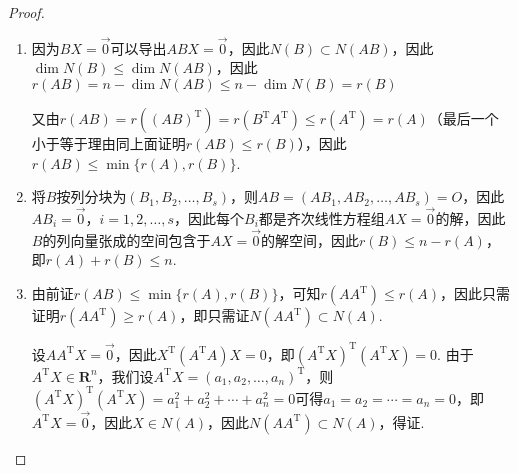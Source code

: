\begin{proof}
    \begin{enumerate}
        \item 因为$BX=\vec{0}$可以导出$ABX=\vec{0}$，因此$N(B)\subset N(AB)$，因此$\dim N(B)\leqslant\dim N(AB)$，因此$r(AB)=n-\dim N(AB)\leqslant n-\dim N(B)=r(B)$

              又由$r(AB)=r((AB)^{\mathrm{T}})=r(B^{\mathrm{T}}A^{\mathrm{T}})\leqslant r(A^{\mathrm{T}})=r(A)$（最后一个小于等于理由同上面证明$r(AB)\leqslant r(B)$），因此$r(AB)\leqslant\min\{r(A),r(B)\}$.

        \item 将$B$按列分块为$(B_1,B_2,\ldots,B_s)$，则$AB=(AB_1,AB_2,\ldots,AB_s)=O$，因此$AB_i=\vec{0}$，$i=1,2,\ldots,s$，因此每个$B_i$都是齐次线性方程组$AX=\vec{0}$的解，因此$B$的列向量张成的空间包含于$AX=\vec{0}$的解空间，因此$r(B)\leqslant n-r(A)$，即$r(A)+r(B)\leqslant n$.

        \item 由前证$r(AB)\leqslant\min\{r(A),r(B)\}$，可知$r(AA^\mathrm{T})\leqslant r(A)$，因此只需证明$r(AA^\mathrm{T})\geqslant r(A)$，即只需证$N(AA^\mathrm{T})\subset N(A)$.

              设$AA^\mathrm{T}X=\vec{0}$，因此$X^\mathrm{T}(A^\mathrm{T}A)X=0$，即$(A^\mathrm{T}X)^\mathrm{T}(A^\mathrm{T}X)=0$. 由于$A^\mathrm{T}X\in\mathbf{R}^n$，我们设$A^\mathrm{T}X=(a_1,a_2,\ldots,a_n)^\mathrm{T}$，则$(A^\mathrm{T}X)^\mathrm{T}(A^\mathrm{T}X)=a_1^2+a_2^2+\cdots+a_n^2=0$可得$a_1=a_2=\cdots=a_n=0$，即$A^\mathrm{T}X=\vec{0}$，因此$X \in N(A)$，因此$N(AA^\mathrm{T})\subset N(A)$，得证.


\end{enumerate}
\end{proof}
